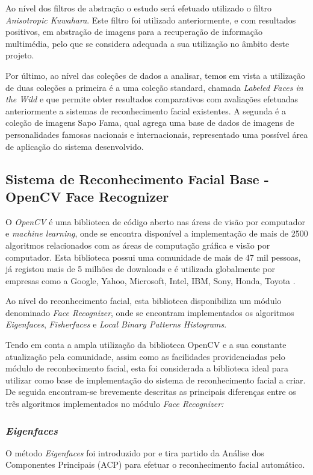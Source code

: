 Ao nível dos filtros de abstração o estudo será efetuado utilizado o filtro \textit{Anisotropic Kuwahara}.
Este filtro foi utilizado anteriormente, e com resultados positivos, em abstração de imagens para a recuperação de informação multimédia, pelo que se considera adequada a sua utilização no âmbito deste projeto.

Por último, ao nível das coleções de dados a analisar, temos em vista a utilização de duas coleções a primeira é a uma coleção standard, chamada \textit{Labeled Faces in the Wild} e que permite obter resultados comparativos com avaliações efetuadas anteriormente a sistemas de reconhecimento facial existentes. A segunda é a coleção de imagens Sapo Fama, qual agrega uma base de dados de imagens de personalidades famosas nacionais e internacionais, representado uma possível área de aplicação do sistema desenvolvido.
	
\subsection{Sistema de Reconhecimento Facial Base - OpenCV Face Recognizer}
O \textit{OpenCV} é uma biblioteca de código aberto nas áreas de visão por computador e \textit{machine learning}, onde se encontra disponível a implementação de mais de 2500 algoritmos relacionados com as áreas de computação gráfica e visão por computador. Esta biblioteca possui uma comunidade de mais de 47 mil pessoas, já registou mais de 5 milhões de downloads e é utilizada globalmente por empresas como a Google, Yahoo, Microsoft, Intel, IBM, Sony, Honda, Toyota \cite{Team}. 

Ao nível do reconhecimento facial, esta biblioteca disponibiliza um módulo denominado \textit{Face Recognizer}, onde se encontram implementados os algoritmos \textit{Eigenfaces}, \textit{Fisherfaces} e \textit{Local Binary Patterns Histograms}.

Tendo em conta a ampla utilização da biblioteca OpenCV e a sua constante atualização pela comunidade, assim como as facilidades providenciadas pelo módulo de reconhecimento facial, esta foi considerada a biblioteca ideal para utilizar como base de implementação do sistema de reconhecimento facial a criar. De seguida encontram-se brevemente descritas as principais diferenças entre os três algoritmos implementados no módulo \textit{Face Recognizer:}

\subsubsection{\textit{Eigenfaces}}
O método \textit{Eigenfaces} foi introduzido por \cite{Belhumeur1997} e tira partido da Análise dos Componentes Principais (ACP) para efetuar o reconhecimento facial automático.

